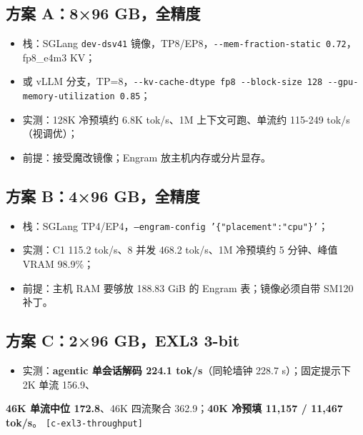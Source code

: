 \subsection{方案 A：8×96 GB，全精度}

\begin{itemize}
  \item 栈：SGLang \texttt{dev-dsv41} 镜像，TP8/EP8，\texttt{-\allowbreak{}-\allowbreak{}mem-\allowbreak{}fraction-\allowbreak{}static\allowbreak{} 0.72}，fp8\_e4m3 KV；
  \item 或 vLLM 分支，TP=8，\texttt{-\allowbreak{}-\allowbreak{}kv-\allowbreak{}cache-\allowbreak{}dtype\allowbreak{} fp8\allowbreak{} -\allowbreak{}-\allowbreak{}block-\allowbreak{}size\allowbreak{} 128\allowbreak{} -\allowbreak{}-\allowbreak{}gpu-\allowbreak{}memory-\allowbreak{}utilization\allowbreak{} 0.85}；
  \item 实测：128K 冷预填约 6.8K tok/s、1M 上下文可跑、单流约 115-\hspace{0pt}249 tok/s（视调优）；
  \item 前提：接受魔改镜像；Engram 放主机内存或分片显存。
\end{itemize}

\subsection{方案 B：4×96 GB，全精度}

\begin{itemize}
  \item 栈：SGLang TP4/EP4，\texttt{--engram-config '\{"placement":"cpu"\}'}；
  \item 实测：C1 115.2 tok/s、8 并发 468.2 tok/s、1M 冷预填约 5 分钟、峰值 VRAM 98.9\%；
  \item 前提：主机 RAM 要够放 188.83 GiB 的 Engram 表；镜像必须自带 SM120 补丁。
\end{itemize}

\subsection{方案 C：2×96 GB，EXL3 3-bit}

\begin{itemize}
  \item 实测：\textbf{agentic 单会话解码 224.1 tok/s}（同轮墙钟 228.7 s）；固定提示下 2K 单流 156.9、
\end{itemize}
  \textbf{46K 单流中位 172.8}、46K 四流聚合 362.9；\textbf{40K 冷预填 11,157 / 11,467 tok/s}。 {\scriptsize\texttt{[c-\hspace{0pt}exl3-\hspace{0pt}throughput]}}

